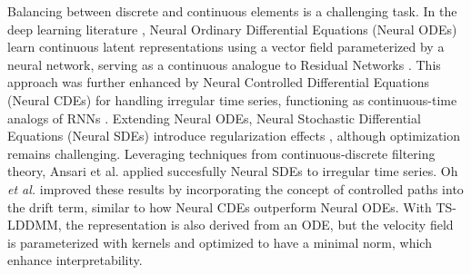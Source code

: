 
 Balancing between discrete and continuous elements is a challenging task.
  In the deep learning literature \cite{chen2018neural, kidger2020neural, tzen2019neural, jia2019neural, liu2019neural, ansari2023neural}, Neural Ordinary Differential Equations (Neural ODEs) \cite{chen2018neural} learn continuous latent representations using a vector field parameterized by a neural network, serving as a continuous analogue to Residual Networks \cite{zagoruyko2016wide}.
   This approach was further enhanced by Neural Controlled Differential Equations (Neural CDEs) \cite{kidger2020neural} for handling irregular time series, functioning as continuous-time analogs of RNNs \cite{schuster1997bidirectional}.
 Extending Neural ODEs, Neural Stochastic Differential Equations (Neural SDEs) introduce regularization effects \cite{liu2019neural}, although optimization remains challenging.
  Leveraging techniques from continuous-discrete filtering theory, Ansari et al. \cite{ansari2023neural} applied succesfully Neural SDEs to irregular time series.
  Oh \textit{et al.} \cite{oh2024stable} improved these results by incorporating the concept of controlled paths into the drift term, similar to how Neural CDEs outperform Neural ODEs.
  With TS-LDDMM, the representation is also derived from an ODE, but the velocity field is parameterized with kernels and optimized to have a minimal norm, which enhance interpretability.

